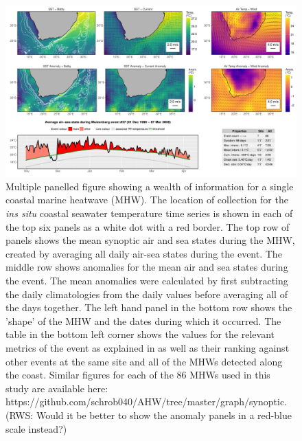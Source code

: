 \documentclass[a4paper,10pt,review]{elsarticle}
\begin{document}
\begin{figure}
\includegraphics[width=1.0\textwidth]{figure_2.pdf}
\caption{Multiple panelled figure showing a wealth of information for a single coastal marine heatwave (MHW). The location of collection for the \emph{ins situ} coastal seawater temperature time series is shown in each of the top six panels as a white dot with a red border. The top row of panels shows the mean synoptic air and sea states during the MHW, created by averaging all daily air-sea states during the event. The middle row shows anomalies for the mean air and sea states during the event. The mean anomalies were calculated by first subtracting the daily climatologies from the daily values before averaging all of the days together. The left hand panel in the bottom row shows the 'shape' of the MHW and the dates during which it occurred. The table in the bottom left corner shows the values for the relevant metrics of the event as explained in  as well as their ranking against other events at the same site and all of the MHWs detected along the coast. Similar figures for each of the 86 MHWs used in this study are available here: https://github.com/schrob040/AHW/tree/master/graph/synoptic. (RWS: Would it be better to show the anomaly panels in a red-blue scale instead?)}
\label{figure2}
\end{figure}
\end{document}
